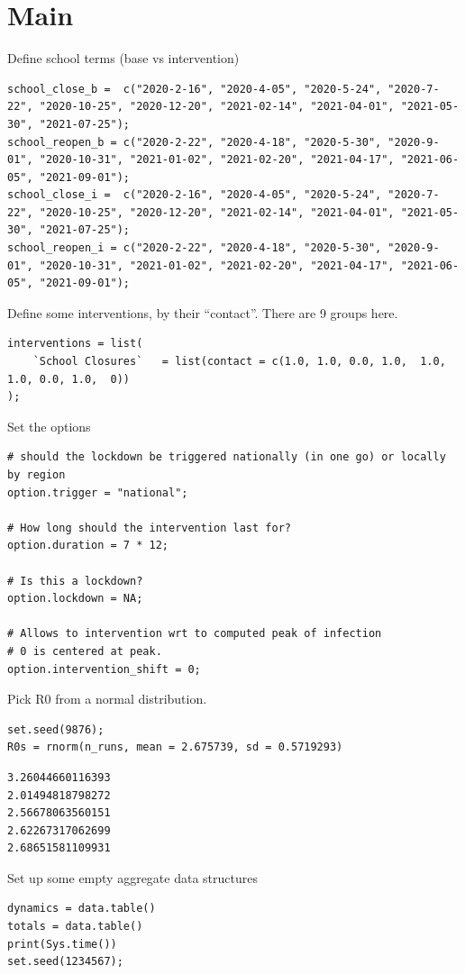 \documentclass[11pt]{article}
\begin{document}
\section{Main}
\label{sec:org89244d4}
Define school terms (base vs intervention)
\begin{verbatim}
school_close_b =  c("2020-2-16", "2020-4-05", "2020-5-24", "2020-7-22", "2020-10-25", "2020-12-20", "2021-02-14", "2021-04-01", "2021-05-30", "2021-07-25");
school_reopen_b = c("2020-2-22", "2020-4-18", "2020-5-30", "2020-9-01", "2020-10-31", "2021-01-02", "2021-02-20", "2021-04-17", "2021-06-05", "2021-09-01");
school_close_i =  c("2020-2-16", "2020-4-05", "2020-5-24", "2020-7-22", "2020-10-25", "2020-12-20", "2021-02-14", "2021-04-01", "2021-05-30", "2021-07-25");
school_reopen_i = c("2020-2-22", "2020-4-18", "2020-5-30", "2020-9-01", "2020-10-31", "2021-01-02", "2021-02-20", "2021-04-17", "2021-06-05", "2021-09-01");
\end{verbatim}

Define some interventions, by their ``contact''. There are 9 groups here.
\begin{verbatim}
interventions = list(
    `School Closures`   = list(contact = c(1.0, 1.0, 0.0, 1.0,  1.0, 1.0, 0.0, 1.0,  0))
);
\end{verbatim}

Set the options
\begin{verbatim}
# should the lockdown be triggered nationally (in one go) or locally by region
option.trigger = "national";

# How long should the intervention last for?
option.duration = 7 * 12;

# Is this a lockdown?
option.lockdown = NA;

# Allows to intervention wrt to computed peak of infection
# 0 is centered at peak.
option.intervention_shift = 0;
\end{verbatim}

Pick R0 from a normal distribution.
\begin{verbatim}
set.seed(9876);
R0s = rnorm(n_runs, mean = 2.675739, sd = 0.5719293)
\end{verbatim}

\begin{verbatim}
3.26044660116393
2.01494818798272
2.56678063560151
2.62267317062699
2.68651581109931
\end{verbatim}

Set up some empty aggregate data structures
\begin{verbatim}
dynamics = data.table()
totals = data.table()
print(Sys.time())
set.seed(1234567);
\end{verbatim}
\end{document}
